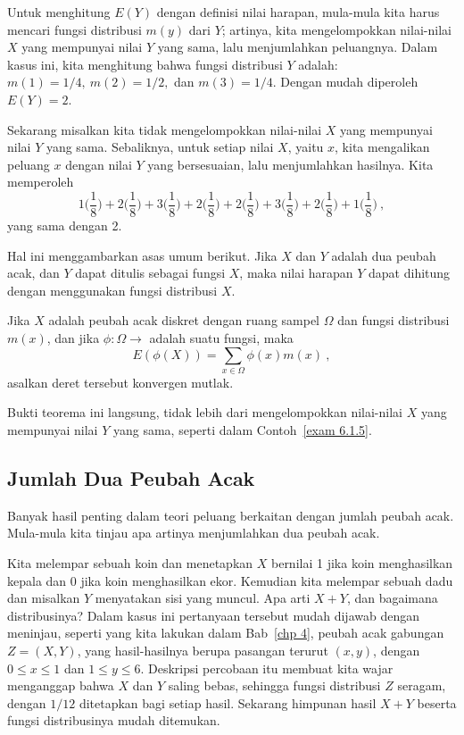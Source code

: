 \begin{example}
Untuk menghitung $E(Y)$ dengan definisi nilai harapan, mula-mula kita harus mencari
fungsi distribusi $m(y)$ dari $Y$; artinya, kita mengelompokkan nilai-nilai $X$ yang
mempunyai nilai $Y$ yang sama, lalu menjumlahkan peluangnya. Dalam kasus ini, kita
menghitung bahwa fungsi distribusi $Y$ adalah: $m(1) = 1/4,\ m(2) = 1/2,$ dan
$m(3) = 1/4$. Dengan mudah diperoleh $E(Y) = 2$.
\par Sekarang misalkan kita tidak mengelompokkan nilai-nilai $X$ yang mempunyai nilai
$Y$ yang sama. Sebaliknya, untuk setiap nilai $X$, yaitu $x$, kita mengalikan peluang
$x$ dengan nilai $Y$ yang bersesuaian, lalu menjumlahkan hasilnya. Kita memperoleh
$$1\biggl(\frac 18\biggr) +2\biggl(\frac 18\biggr) +3\biggl(\frac 18\biggr)
+2\biggl(\frac 18\biggr) +2\biggl(\frac 18\biggr) +3\biggl(\frac 18\biggr)
+2\biggl(\frac 18\biggr) +1\biggl(\frac 18\biggr)\ ,$$ yang sama dengan 2.
\par Hal ini menggambarkan asas umum berikut. Jika $X$ dan $Y$ adalah dua peubah acak,
dan $Y$ dapat ditulis sebagai fungsi $X$, maka nilai harapan $Y$ dapat dihitung dengan
menggunakan fungsi distribusi $X$.
\end{example}

\begin{theorem}\label{thm 6.3.5} Jika $X$ adalah peubah acak diskret dengan ruang
sampel $\Omega$ dan fungsi distribusi $m(x)$, dan jika
$\phi : \Omega \to$  adalah suatu fungsi, maka
$$ E(\phi(X)) = \sum_{x \in \Omega} \phi(x) m(x)\ ,
$$ asalkan deret tersebut konvergen mutlak.
\end{theorem}
 
Bukti teorema ini langsung, tidak lebih dari mengelompokkan nilai-nilai $X$ yang
mempunyai nilai $Y$ yang sama, seperti dalam Contoh~\ref{exam 6.1.5}.

\subsection*{Jumlah Dua Peubah Acak}

Banyak hasil penting dalam teori peluang berkaitan dengan jumlah peubah acak. Mula-mula
kita tinjau apa artinya menjumlahkan dua peubah acak.

\begin{example}\label{exam 6.06} Kita melempar sebuah koin dan menetapkan $X$ bernilai
1 jika koin menghasilkan kepala dan 0 jika koin menghasilkan ekor. Kemudian kita
melempar sebuah dadu dan misalkan $Y$ menyatakan sisi yang muncul. Apa arti $X+Y$,
dan bagaimana distribusinya? Dalam kasus ini pertanyaan tersebut mudah dijawab dengan
meninjau, seperti yang kita lakukan dalam Bab~\ref{chp 4}, peubah acak gabungan
$Z = (X,Y)$, yang hasil-hasilnya berupa pasangan terurut $(x, y)$, dengan
$0 \le x \le 1$ dan $1 \le y \le 6$. Deskripsi percobaan itu membuat kita wajar
menganggap bahwa $X$ dan $Y$ saling bebas, sehingga fungsi distribusi $Z$ seragam,
dengan $1/12$ ditetapkan bagi setiap hasil. Sekarang himpunan hasil $X+Y$ beserta
fungsi distribusinya mudah ditemukan.
\end{example}

